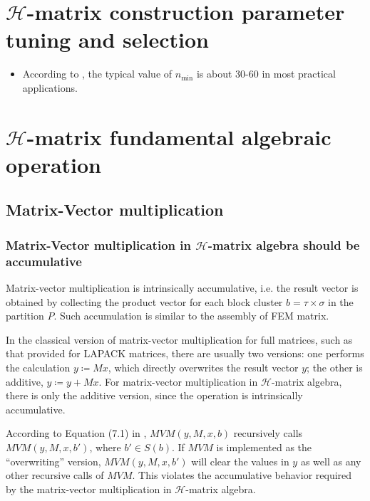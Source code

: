 \documentclass[11pt, a4paper]{book}
\begin{document}
\section{$\mathcal{H}$-matrix construction parameter tuning and selection}

\begin{itemize}
\item According to \citep{KriemannParallel2005a}, the typical value of $n_{\min}$ is about
  30-60 in most practical applications.
\end{itemize}

\section{$\mathcal{H}$-matrix fundamental algebraic operation}

\subsection{Matrix-Vector multiplication}
\label{sec:hmat-vmult}

\subsubsection{Matrix-Vector multiplication in $\mathcal{H}$-matrix algebra should be accumulative}

Matrix-vector multiplication is intrinsically accumulative, i.e. the result vector is obtained by
collecting the product vector for each block cluster $b=\tau\times\sigma$ in the partition $P$. Such
accumulation is similar to the assembly of FEM matrix.

In the classical version of matrix-vector multiplication for full matrices, such as that provided
for LAPACK matrices, there are usually two versions: one performs the calculation $y \coloneqq Mx$,
which directly overwrites the result vector $y$; the other is additive, $y \coloneqq y + Mx$. For
matrix-vector multiplication in $\mathcal{H}$-matrix algebra, there is only the additive version,
since the operation is intrinsically accumulative.

According to Equation (7.1) in \citep{HackbuschHierarchical2015}, $MVM(y, M, x, b)$
recursively calls $MVM(y, M, x, b')$, where $b'\in S(b)$. If $MVM$ is implemented as the
``overwriting'' version, $MVM(y, M, x, b')$ will clear the values in $y$ as well as any other
recursive calls of $MVM$. This violates the accumulative behavior required by the matrix-vector
multiplication in $\mathcal{H}$-matrix algebra.
\end{document}
